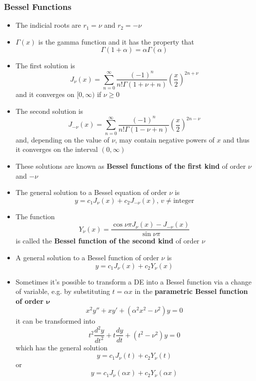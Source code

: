 \documentclass{article}
\begin{document}
\subsubsection{Bessel Functions}

\begin{itemize}
  \item The indicial roots are $r_1 = \nu$ and $r_2 = -\nu$

  \item $\Gamma(x)$ is the gamma function and it has the property that \[\Gamma(1 + \alpha) = \alpha \Gamma(\alpha)\]

  \item The first solution is \[J_\nu(x) = \sum_{n = 0}^\infty \frac{(-1)^n}{n! \Gamma(1 + \nu + n)} \left( \frac{x}{2} \right)^{2 n + \nu}\] and it converges on $[0, \infty)$ if $\nu \ge 0$

  \item The second solution is \[J_{-\nu}(x) = \sum_{n = 0}^\infty \frac{(-1)^n}{n! \Gamma(1 - \nu + n)} \left( \frac{x}{2} \right)^{2 n - \nu}\] and, depending on the value of $\nu$, may contain negative powers of $x$ and thus it converges on the interval $(0, \infty)$

  \item These solutions are known as \textbf{Bessel functions of the first kind} of order $\nu$ and $-\nu$

  \item The general solution to a Bessel equation of order $\nu$ is \[y = c_1 J_\nu(x) + c_2 J_{-\nu}(x), \,v \ne \text{integer}\]

  \item The function \[Y_\nu(x) = \frac{\cos \nu \pi J_\nu(x) - J_{-\nu}(x)}{\sin \nu \pi}\] is called the \textbf{Bessel function of the second kind} of order $\nu$

  \item A general solution to a Bessel function of order $\nu$ is \[y = c_1 J_\nu(x) + c_2 Y_\nu(x)\]

  \item Sometimes it's possible to transform a DE into a Bessel function via a change of variable, e.g. by substituting $t = \alpha x$ in the \textbf{parametric Bessel function of order $\boldsymbol{\nu}$} \[x^2 y'' + x y' + (\alpha^2 x^2 - \nu^2) y = 0\] it can be transformed into \[t^2 \frac{d^2 y}{d t^2} + t \frac{d y}{d t} + (t^2 - \nu^2) y = 0\] which has the general solution \[y = c_1 J_\nu(t) + c_2 Y_\nu(t)\] or \[y = c_1 J_\nu(\alpha x) + c_2 Y_\nu(\alpha x)\]
\end{itemize}
\end{document}
